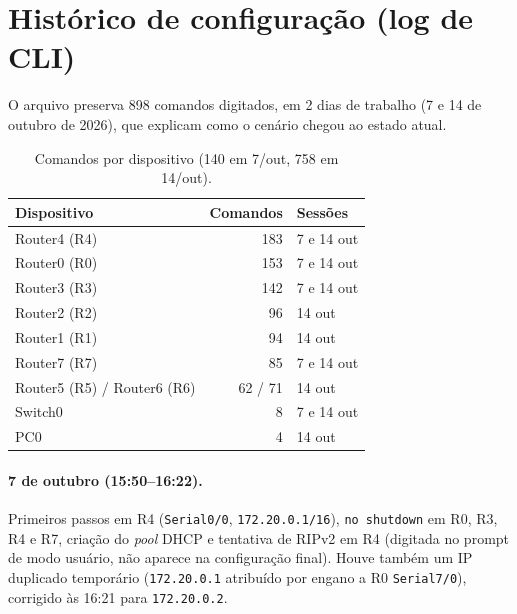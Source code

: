 \documentclass[12pt,a4paper]{article}
\begin{document}
\section{Histórico de configuração (log de CLI)}
O arquivo preserva 898 comandos digitados, em 2 dias de trabalho (7 e 14 de outubro de 2026), que explicam como o cenário chegou ao estado atual.
\begin{table}[H]\centering\small
\begin{tabular}{@{}lrl@{}}\toprule
Dispositivo & Comandos & Sessões\\\midrule
Router4 (R4) & 183 & 7 e 14 out\\
Router0 (R0) & 153 & 7 e 14 out\\
Router3 (R3) & 142 & 7 e 14 out\\
Router2 (R2) & 96 & 14 out\\
Router1 (R1) & 94 & 14 out\\
Router7 (R7) & 85 & 7 e 14 out\\
Router5 (R5) / Router6 (R6) & 62 / 71 & 14 out\\
Switch0 & 8 & 7 e 14 out\\
PC0 & 4 & 14 out\\\bottomrule
\end{tabular}
\caption{Comandos por dispositivo (140 em 7/out, 758 em 14/out).}
\end{table}

\paragraph{7 de outubro (15:50--16:22).} Primeiros passos em R4 (\texttt{Serial0/0}, \texttt{172.20.0.1/16}), \texttt{no shutdown} em R0, R3, R4 e R7, criação do \textit{pool} DHCP e tentativa de RIPv2 em R4 (digitada no prompt de modo usuário, não aparece na configuração final). Houve também um IP duplicado temporário (\texttt{172.20.0.1} atribuído por engano a R0 \texttt{Serial7/0}), corrigido às 16:21 para \texttt{172.20.0.2}.
\end{document}
